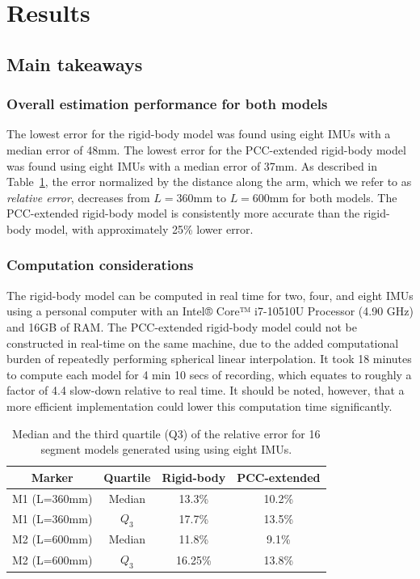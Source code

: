 \section{Results}   \label{sec:results}

\subsection{Main takeaways} 

\subsubsection{Overall estimation performance for both models}
The lowest error for the rigid-body model was found using eight IMUs with a median error of 48mm. 
The lowest error for the PCC-extended rigid-body model was found using eight IMUs with a median error of 37mm. 
As described in Table~\ref{tab:rel_arr_both_models}, the error normalized by the distance along the arm, which we refer to as \emph{relative error}, decreases from $L=360$mm to $L=600$mm for both models.
The PCC-extended rigid-body model is consistently more accurate than the rigid-body model, with approximately 25\% lower error.

\subsubsection{Computation considerations}
The rigid-body model can be computed in real time for two, four, and eight IMUs using a personal computer with an Intel® Core™ i7-10510U Processor (4.90 GHz) and 16GB of RAM.
The PCC-extended rigid-body model could not be constructed in real-time on the same machine, due to the added computational burden of repeatedly performing spherical linear interpolation. 
It took 18 minutes to compute each model for 4 min 10 secs of recording, which equates to roughly a factor of 4.4 slow-down relative to real time.
It should be noted, however, that a more efficient implementation could lower this computation time  significantly.

\begin{table}[]
    \centering
\begin{tabular}{|c|c|c|c|}

\hline
  Marker & Quartile & Rigid-body & PCC-extended \\

\hline
 M1 (L=360mm)  &  Median & 13.3\% &  10.2\% \\
\hline 
M1 (L=360mm) & $Q_3$ &17.7\% & 13.5\% \\
\hline
 M2 (L=600mm)   &  Median & 11.8\% & 9.1\% \\
\hline 
 M2 (L=600mm) & $Q_3$ & 16.25\% & 13.8\% \\
\hline
\end{tabular}
    \caption{Median and the third quartile (Q3) of the relative error for 16 segment models generated using
    using eight IMUs.}
    \label{tab:rel_arr_both_models}
\end{table}

